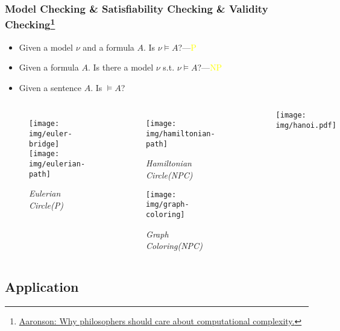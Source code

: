 \documentclass[UTF8,aspectratio=43,11pt,colorlinks,compress,openany]{beamer}%
\begin{document}
\begin{frame}\frametitle{\small Model Checking \& Satisfiability Checking \& Validity Checking\footnote{\tiny \href{https://www.scottaaronson.com/papers/philos.pdf}{Aaronson: Why philosophers should care about computational complexity.}}}
	\begin{itemize}
		\item Given a model $\nu$ and a formula $A$. Is $\nu\vDash A$?\hfill ---\textcolor{yellow}{P}
		\item Given a formula $A$. Is there a model $\nu$ s.t. $\nu\vDash A$?\hfill ---\textcolor{yellow}{NP}
		\item Given a sentence $A$. Is $\vDash A$?
	\end{itemize}
\begin{minipage}{\textwidth}
	\begin{columns}
			\begin{figure}
				\texttt{[image: img/euler-bridge]}\\
				\texttt{[image: img/eulerian-path]}\caption{\tiny{\textit{Eulerian Circle(P)}}}
			\end{figure}
		\vspace{-0.3cm}
			\begin{figure}
				\texttt{[image: img/hamiltonian-path]}\vspace{-0.2cm}\caption{\tiny{\textit{Hamiltonian Circle(NPC)}}}\vspace{-0.2cm}
				\texttt{[image: img/graph-coloring]}\vspace{-0.3cm}\caption{\tiny{\textit{Graph Coloring(NPC)}}}
			\end{figure}
		\vspace{-0.5cm}
			\begin{center}
				\begin{figure}
					\texttt{[image: img/hanoi.pdf]}
				\end{figure}
			\end{center}
	\end{columns}
\end{minipage}
\end{frame}

\subsection{Application}
\end{document}

